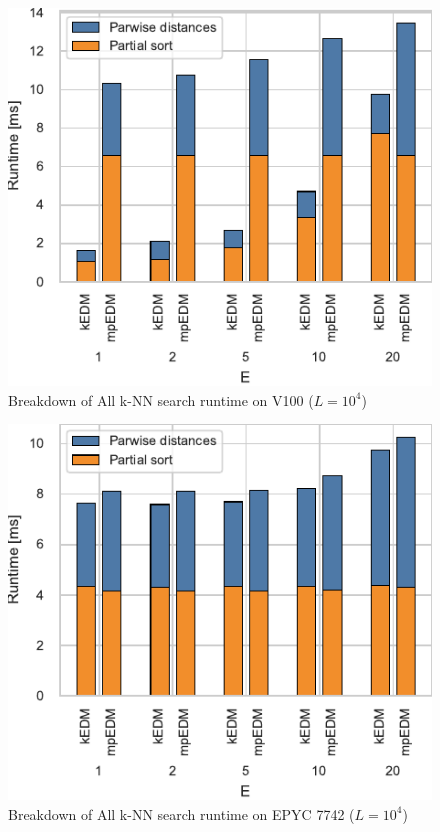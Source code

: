 \documentclass[sigconf]{acmart}
\begin{document}
\begin{figure}
    \centering
    \includegraphics{figs/breakdown_knn_v100}
    \caption{Breakdown of All k-NN search runtime on V100 ($L=10^4$)}%
    \label{fig:breakdown-knn-v100}
\end{figure}

\begin{figure}
    \centering
    \includegraphics{figs/breakdown_knn_epyc}
    \caption{Breakdown of All k-NN search runtime on EPYC 7742 ($L=10^4$)}%
    \label{fig:breakdown-knn-epyc}
\end{figure}
\end{document}
